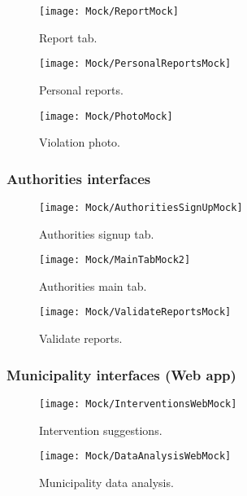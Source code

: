 \begin{figure}[H]
	\centering
	\begin{minipage}[b]{0.38\linewidth}
		\texttt{[image: Mock/ReportMock]}
		\caption{Report tab.}
	\end{minipage}
	\begin{minipage}[b]{0.38\linewidth}
		\texttt{[image: Mock/PersonalReportsMock]}
		\caption{Personal reports.}
	\end{minipage}	
\end{figure}

\begin{figure}[H]
	\centering
	\begin{minipage}[b]{0.99\linewidth}
		\texttt{[image: Mock/PhotoMock]}
		\caption{Violation photo.}
	\end{minipage}
\end{figure}

\subsubsection{Authorities interfaces}

\begin{figure}[H]
	\centering
	\begin{minipage}[b]{0.38\linewidth}
	    \texttt{[image: Mock/AuthoritiesSignUpMock]}
	    \caption{\small Authorities signup tab.}
	\end{minipage}
	\begin{minipage}[b]{0.38\linewidth}
		\texttt{[image: Mock/MainTabMock2]}
		\caption{\small Authorities main tab.}
		\label{mainTab2}
	\end{minipage}
	\begin{minipage}[b]{0.38\linewidth}
		\texttt{[image: Mock/ValidateReportsMock]}
		\caption{\small Validate reports.}
	\end{minipage}
\end{figure}

\subsubsection{Municipality interfaces (Web app)}

\begin{figure}[H]
	\centering
	\begin{minipage}[b]{0.8\linewidth}
	    \texttt{[image: Mock/InterventionsWebMock]}
	    \caption{Intervention suggestions.}
	\end{minipage}
\end{figure}

\begin{figure}[H]
	\centering
	\begin{minipage}[b]{0.8\linewidth}
		\texttt{[image: Mock/DataAnalysisWebMock]}
		\caption{Municipality data analysis.}
	\end{minipage}
\end{figure}






